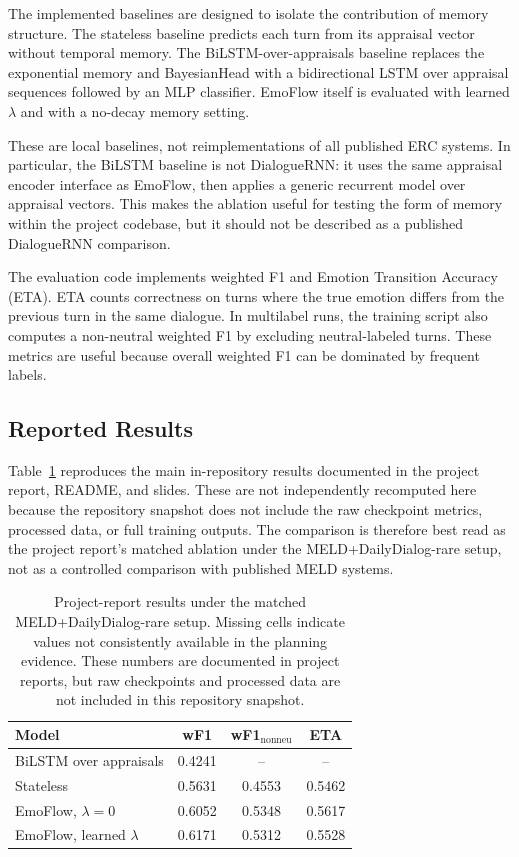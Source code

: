 \documentclass[11pt]{article}
\begin{document}
The implemented baselines are designed to isolate the contribution of memory structure. The stateless baseline predicts each turn from its appraisal vector without temporal memory. The BiLSTM-over-appraisals baseline replaces the exponential memory and BayesianHead with a bidirectional LSTM over appraisal sequences followed by an MLP classifier. EmoFlow itself is evaluated with learned $\lambda$ and with a no-decay memory setting.

These are local baselines, not reimplementations of all published ERC systems. In particular, the BiLSTM baseline is not DialogueRNN: it uses the same appraisal encoder interface as EmoFlow, then applies a generic recurrent model over appraisal vectors. This makes the ablation useful for testing the form of memory within the project codebase, but it should not be described as a published DialogueRNN comparison.

The evaluation code implements weighted F1 and Emotion Transition Accuracy (ETA). ETA counts correctness on turns where the true emotion differs from the previous turn in the same dialogue. In multilabel runs, the training script also computes a non-neutral weighted F1 by excluding neutral-labeled turns. These metrics are useful because overall weighted F1 can be dominated by frequent labels.

\subsection{Reported Results}

Table~\ref{tab:results} reproduces the main in-repository results documented in the project report, README, and slides. These are not independently recomputed here because the repository snapshot does not include the raw checkpoint metrics, processed data, or full training outputs. The comparison is therefore best read as the project report's matched ablation under the MELD+DailyDialog-rare setup, not as a controlled comparison with published MELD systems.

\begin{table}[t]
\centering
\small
\begin{tabular}{lccc}
\toprule
Model & wF1 & wF1$_{\mathrm{nonneu}}$ & ETA \\
\midrule
BiLSTM over appraisals & 0.4241 & -- & -- \\
Stateless & 0.5631 & 0.4553 & 0.5462 \\
EmoFlow, $\lambda=0$ & 0.6052 & 0.5348 & 0.5617 \\
EmoFlow, learned $\lambda$ & 0.6171 & 0.5312 & 0.5528 \\
\bottomrule
\end{tabular}
\caption{Project-report results under the matched MELD+DailyDialog-rare setup. Missing cells indicate values not consistently available in the planning evidence. These numbers are documented in project reports, but raw checkpoints and processed data are not included in this repository snapshot.}
\label{tab:results}
\end{table}
\end{document}

